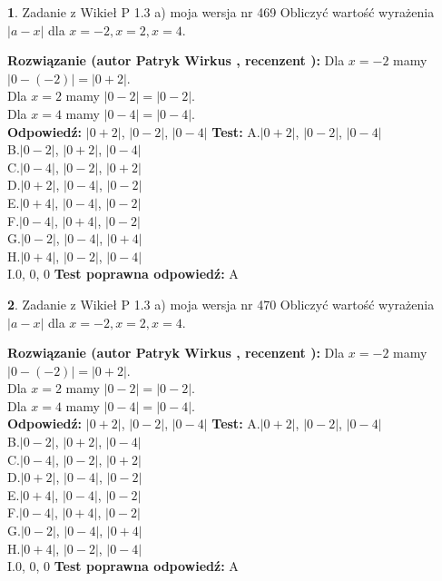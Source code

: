 \documentclass[12pt, a4paper]{article}
\theoremstyle{definition} %
\newtheorem{zad}{}
\newcommand{\zadStart}[1]{\begin{zad}#1\newline}
\newcommand{\zadStop}{\end{zad}}
\newcommand{\rozwStart}[2]{\noindent \textbf{Rozwiązanie (autor #1 , recenzent #2): }\newline}
\newcommand{\rozwStop}{\newline}
\newcommand{\odpStart}{\noindent \textbf{Odpowiedź:}\newline}
\newcommand{\odpStop}{\newline}
\newcommand{\testStart}{\noindent \textbf{Test:}\newline}
\newcommand{\testStop}{\newline}
\newcommand{\kluczStart}{\noindent \textbf{Test poprawna odpowiedź:}\newline}
\newcommand{\kluczStop}{\newline}
\begin{document}
\zadStart{Zadanie z Wikieł P 1.3 a) moja wersja nr 469}
Obliczyć wartość wyrażenia $|a - x|$ dla $x=-2,x=2,x=4$.
\zadStop
\rozwStart{Patryk Wirkus}{}
Dla $x = -2$ mamy $|0 - (-2)| = |0 + 2|$.\\
Dla $x = 2$ mamy $|0 - 2| = |0 - 2|$.\\
Dla $x = 4$ mamy $|0 - 4| = |0 - 4|$.\\
\rozwStop
\odpStart
$|0 + 2|$, $|0 - 2|$, $|0 - 4|$
\odpStop
\testStart
A.$|0 + 2|$, $|0 - 2|$, $|0 - 4|$\\
B.$|0 - 2|$, $|0 + 2|$, $|0 - 4|$\\
C.$|0 - 4|$, $|0 - 2|$, $|0 + 2|$\\
D.$|0 + 2|$, $|0 - 4|$, $|0 - 2|$\\
E.$|0 + 4|$, $|0 - 4|$, $|0 - 2|$\\
F.$|0 - 4|$, $|0 + 4|$, $|0 - 2|$\\
G.$|0 - 2|$, $|0 - 4|$, $|0 + 4|$\\
H.$|0 + 4|$, $|0 - 2|$, $|0 - 4|$\\
I.$0$, $0$, $0$
\testStop
\kluczStart
A
\kluczStop



\zadStart{Zadanie z Wikieł P 1.3 a) moja wersja nr 470}
Obliczyć wartość wyrażenia $|a - x|$ dla $x=-2,x=2,x=4$.
\zadStop
\rozwStart{Patryk Wirkus}{}
Dla $x = -2$ mamy $|0 - (-2)| = |0 + 2|$.\\
Dla $x = 2$ mamy $|0 - 2| = |0 - 2|$.\\
Dla $x = 4$ mamy $|0 - 4| = |0 - 4|$.\\
\rozwStop
\odpStart
$|0 + 2|$, $|0 - 2|$, $|0 - 4|$
\odpStop
\testStart
A.$|0 + 2|$, $|0 - 2|$, $|0 - 4|$\\
B.$|0 - 2|$, $|0 + 2|$, $|0 - 4|$\\
C.$|0 - 4|$, $|0 - 2|$, $|0 + 2|$\\
D.$|0 + 2|$, $|0 - 4|$, $|0 - 2|$\\
E.$|0 + 4|$, $|0 - 4|$, $|0 - 2|$\\
F.$|0 - 4|$, $|0 + 4|$, $|0 - 2|$\\
G.$|0 - 2|$, $|0 - 4|$, $|0 + 4|$\\
H.$|0 + 4|$, $|0 - 2|$, $|0 - 4|$\\
I.$0$, $0$, $0$
\testStop
\kluczStart
A
\kluczStop
\end{document}
